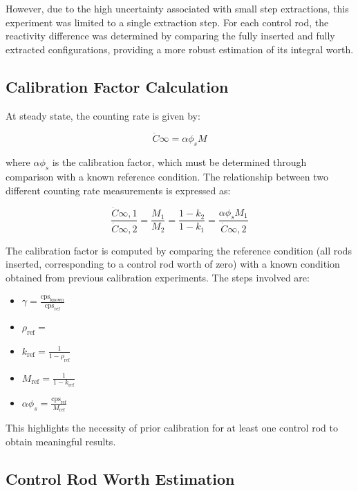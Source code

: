 However, due to the high uncertainty associated with small step extractions, this experiment was limited to a single extraction step. For each control rod, the reactivity difference was determined by comparing the fully inserted and fully extracted configurations, providing a more robust estimation of its integral worth.

\subsection{Calibration Factor Calculation}

At steady state, the counting rate is given by:

\begin{equation}
\dot{C}{\infty} = \alpha \phi_s M
\end{equation}

where $ \alpha \phi_s $ is the calibration factor, which must be determined through comparison with a known reference condition. The relationship between two different counting rate measurements is expressed as:

\begin{equation}
\frac{\dot{C}{\infty,1}}{\dot{C}{\infty,2}} = \frac{M_1}{M_2} = \frac{1-k_2}{1-k_1} = \frac{\alpha \phi_s M_1}{\dot{C}{\infty,2}}
\end{equation}

The calibration factor is computed by comparing the reference condition (all rods inserted, corresponding to a control rod worth of zero) with a known condition obtained from previous calibration experiments. The steps involved are:

\begin{itemize}
    \item $ \gamma = \frac{\text{cps}_{\text{known}}}{\text{cps}_{\text{ref}}} $
    \item $ \rho_{\text{ref}} = $ \quad {}
    \item $ k_{\text{ref}} = \frac{1}{1 - \rho_{\text{ref}}} $
    \item $ M_{\text{ref}} = \frac{1}{1 - k_{\text{ref}}} $
    \item $ \alpha \phi_s = \frac{\text{cps}_{\text{ref}}}{M_{\text{ref}}} $
\end{itemize}
This highlights the necessity of prior calibration for at least one control rod to obtain meaningful results.

\subsection{Control Rod Worth Estimation}

